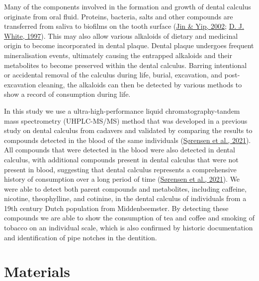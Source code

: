 \documentclass[
  letterpaper,
]{book}
\begin{document}
Many of the components involved in the formation and growth of dental
calculus originate from oral fluid. Proteins, bacteria, salts and other
compounds are transferred from saliva to biofilms on the tooth surface
(\protect\hyperlink{ref-jinSupragingivalCalculus2002}{Jin \& Yip, 2002};
\protect\hyperlink{ref-whiteDentalCalculus1997}{D. J. White, 1997}).
This may also allow various alkaloids of dietary and medicinal origin to
become incorporated in dental plaque. Dental plaque undergoes frequent
mineralisation events, ultimately causing the entrapped alkaloids and
their metabolites to become preserved within the dental calculus.
Barring intentional or accidental removal of the calculus during life,
burial, excavation, and post-excavation cleaning, the alkaloids can then
be detected by various methods to show a record of consumption during
life.

In this study we use a ultra-high-performance liquid
chromatography-tandem mass spectrometry (UHPLC-MS/MS) method that was
developed in a previous study on dental calculus from cadavers and
validated by comparing the results to compounds detected in the blood of
the same individuals
(\protect\hyperlink{ref-sorensenDrugsCalculus2021}{Sørensen et al.,
2021}). All compounds that were detected in the blood were also detected
in dental calculus, with additional compounds present in dental calculus
that were not present in blood, suggesting that dental calculus
represents a comprehensive history of consumption over a long period of
time (\protect\hyperlink{ref-sorensenDrugsCalculus2021}{Sørensen et al.,
2021}). We were able to detect both parent compounds and metabolites,
including caffeine, nicotine, theophylline, and cotinine, in the dental
calculus of individuals from a 19th century Dutch population from
Middenbeemster. By detecting these compounds we are able to show the
consumption of tea and coffee and smoking of tobacco on an individual
scale, which is also confirmed by historic documentation and
identification of pipe notches in the dentition.

\hypertarget{mb11CalculusPilot-mat}{%
\section{Materials}\label{mb11CalculusPilot-mat}}
\end{document}
